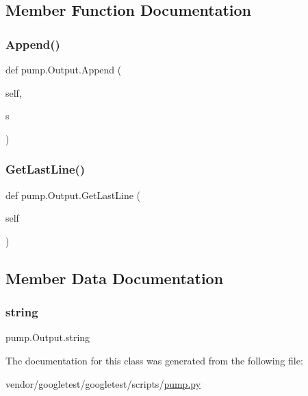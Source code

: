 \subsection{Member Function Documentation}
\mbox{\label{classpump_1_1_output_a6f284bb3f80e03594bc28286c695f5a7}} 
\subsubsection{\texorpdfstring{Append()}{Append()}}
{\footnotesize\ttfamily def pump.\+Output.\+Append (\begin{DoxyParamCaption}\item[{}]{self,  }\item[{}]{s }\end{DoxyParamCaption})}

\mbox{\label{classpump_1_1_output_a6ece94d24be171bae2a2234c052b4c58}} 
\subsubsection{\texorpdfstring{Get\+Last\+Line()}{GetLastLine()}}
{\footnotesize\ttfamily def pump.\+Output.\+Get\+Last\+Line (\begin{DoxyParamCaption}\item[{}]{self }\end{DoxyParamCaption})}



\subsection{Member Data Documentation}
\mbox{\label{classpump_1_1_output_a8786848ab3d235189379c449a446f883}} 
\subsubsection{\texorpdfstring{string}{string}}
{\footnotesize\ttfamily pump.\+Output.\+string}



The documentation for this class was generated from the following file\+:\begin{DoxyCompactItemize}
\item 
vendor/googletest/googletest/scripts/\hyperlink{pump_8py}{pump.\+py}\end{DoxyCompactItemize}
